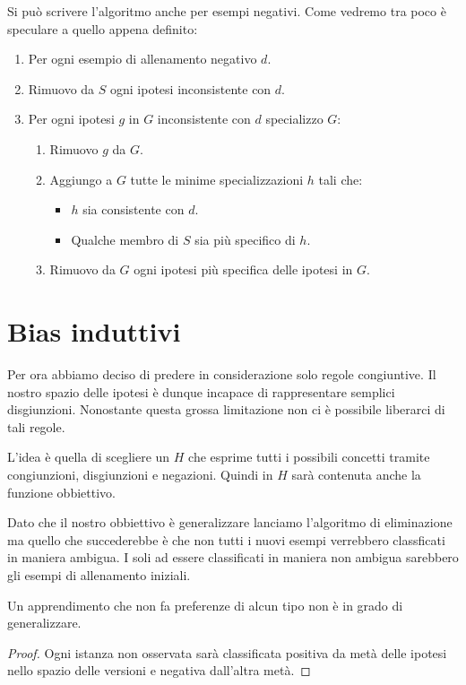 Si pu\`o scrivere l'algoritmo anche per esempi negativi. Come vedremo tra poco \`e speculare a quello appena definito:
\begin{enumerate}
	\item Per ogni esempio di allenamento negativo $d$.
	\item Rimuovo da $S$ ogni ipotesi inconsistente con $d$.
	\item Per ogni ipotesi $g$ in $G$ inconsistente con $d$ specializzo $G$:
	      \begin{enumerate}
		      \item Rimuovo $g$ da $G$.
		      \item Aggiungo a $G$ tutte le minime specializzazioni $h$ tali che:
		            \begin{itemize}
			            \item $h$ sia consistente con $d$.
			            \item Qualche membro di $S$ sia pi\`u specifico di $h$.
		            \end{itemize}
		      \item Rimuovo da $G$ ogni ipotesi pi\`u specifica delle ipotesi in $G$.
	      \end{enumerate}
\end{enumerate}

\section{Bias induttivi}
Per ora abbiamo deciso di predere in considerazione solo regole congiuntive. Il nostro spazio delle ipotesi \`e dunque
incapace di rappresentare semplici disgiunzioni. Nonostante questa grossa limitazione non ci \`e possibile liberarci
di tali regole.

L'idea \`e quella di scegliere un $H$ che esprime tutti i possibili concetti tramite congiunzioni, disgiunzioni e negazioni.
Quindi in $H$ sar\`a contenuta anche la funzione obbiettivo.

Dato che il nostro obbiettivo \`e generalizzare lanciamo l'algoritmo di eliminazione ma quello che succederebbe \`e che non
tutti i nuovi esempi verrebbero classficati in maniera ambigua. I soli ad essere classificati in maniera non ambigua
sarebbero gli esempi di allenamento iniziali.

\begin{theorem}
	Un apprendimento che non fa preferenze di alcun tipo non \`e in grado di generalizzare.
	\begin{proof}
		Ogni istanza non osservata sar\`a classificata positiva da met\`a delle ipotesi nello spazio delle versioni e
		negativa dall'altra met\`a.
	\end{proof}
\end{theorem}

